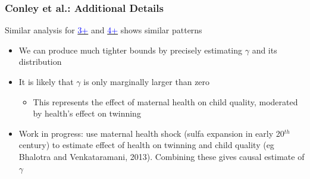 \documentclass[10pt,letterpaper,subeqn]{beamer}
\begin{document}

\begin{frame}[label=Conley]
\frametitle{Conley et al.: Additional Details}
Similar analysis for \hyperlink{three}{\textcolor{blue}{3+}} and \hyperlink{four}{\textcolor{blue}{4+}} shows similar patterns
\vspace{5mm}
\begin{itemize}
\item We can produce much tighter bounds by precisely estimating $\gamma$ and its distribution
\item It is likely that $\gamma$ is only marginally larger than zero
\begin{itemize}
\item This represents the effect of maternal health on child quality, moderated by health's effect on twinning
\end{itemize}
\item Work in progress: use maternal health shock (sulfa expansion in early 20$^{th}$ century) to estimate
effect of health on twinning and child quality (eg Bhalotra and Venkataramani, 2013).  Combining these gives causal estimate of $\gamma$
\end{itemize}
\end{frame}

\frame{
\begin{center}
\Large \textcolor{blue}{Conclusions}
\end{center}
}
\end{document}
